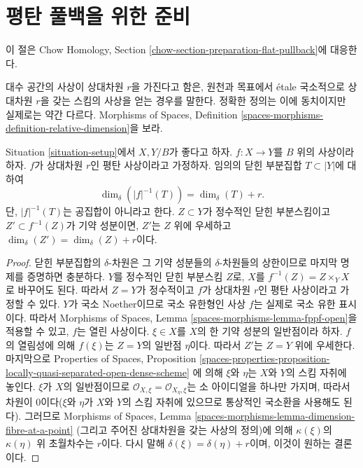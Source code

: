 \section{평탄 풀백을 위한 준비}
\label{section-preparation-flat-pullback}

\noindent
이 절은 Chow Homology, Section
\ref{chow-section-preparation-flat-pullback}에 대응한다.

\medskip\noindent
대수 공간의 사상이 상대차원 $r$을 가진다고 함은, 원천과 목표에서
\'etale 국소적으로 상대차원 $r$을 갖는 스킴의 사상을 얻는 경우를 말한다.
정확한 정의는 이에 동치이지만 실제로는 약간 다르다. Morphisms of Spaces,
Definition
\ref{spaces-morphisms-definition-relative-dimension}을 보라.

\begin{lemma}
\label{lemma-flat-inverse-image-dimension}
Situation \ref{situation-setup}에서 $X, Y/B$가 좋다고 하자.
$f : X \to Y$를 $B$ 위의 사상이라 하자.
$f$가 상대차원 $r$인 평탄 사상이라고 가정하자.
임의의 닫힌 부분집합 $T \subset |Y|$에 대하여
$$
\dim_\delta(|f|^{-1}(T)) = \dim_\delta(T) + r.
$$
단, $|f|^{-1}(T)$는 공집합이 아니라고 한다.
$Z \subset Y$가 정수적인 닫힌 부분스킴이고
$Z' \subset f^{-1}(Z)$가 기약 성분이면, $Z'$는 $Z$ 위에 우세하고
$\dim_\delta(Z') = \dim_\delta(Z) + r$이다.
\end{lemma}

\begin{proof}
닫힌 부분집합의 $\delta$-차원은 그 기약 성분들의 $\delta$-차원들의
상한이므로 마지막 명제를 증명하면 충분하다. $Y$를 정수적인 닫힌 부분스킴
$Z$로, $X$를 $f^{-1}(Z) = Z \times_Y X$로 바꾸어도 된다.
따라서 $Z = Y$가 정수적이고 $f$가 상대차원 $r$인 평탄 사상이라고
가정할 수 있다. $Y$가 국소 Noether이므로 국소 유한형인 사상 $f$는
실제로 국소 유한 표시이다. 따라서 Morphisms of Spaces, Lemma
\ref{spaces-morphisms-lemma-fppf-open}을 적용할 수 있고, $f$는 열린 사상이다.
$\xi \in X$를 $X$의 한 기약 성분의 일반점이라 하자.
$f$의 열림성에 의해 $f(\xi)$는 $Z = Y$의 일반점 $\eta$이다.
따라서 $Z'$는 $Z = Y$ 위에 우세한다. 마지막으로 Properties of Spaces,
Proposition
\ref{spaces-properties-proposition-locally-quasi-separated-open-dense-scheme}
에 의해 $\xi$와 $\eta$는 $X$와 $Y$의 스킴 자취에 놓인다.
$\xi$가 $X$의 일반점이므로
$\mathcal{O}_{X, \xi} = \mathcal{O}_{X_\eta, \xi}$는 소 아이디얼을
하나만 가지며, 따라서 차원이 $0$이다($\xi$와 $\eta$가 $X$와 $Y$의
스킴 자취에 있으므로 통상적인 국소환을 사용해도 된다).
그러므로 Morphisms of Spaces, Lemma
\ref{spaces-morphisms-lemma-dimension-fibre-at-a-point}
(그리고 주어진 상대차원을 갖는 사상의 정의)에 의해
$\kappa(\xi)$의 $\kappa(\eta)$ 위 초월차수는 $r$이다.
다시 말해 $\delta(\xi) = \delta(\eta) + r$이며, 이것이 원하는 결론이다.
\end{proof}

